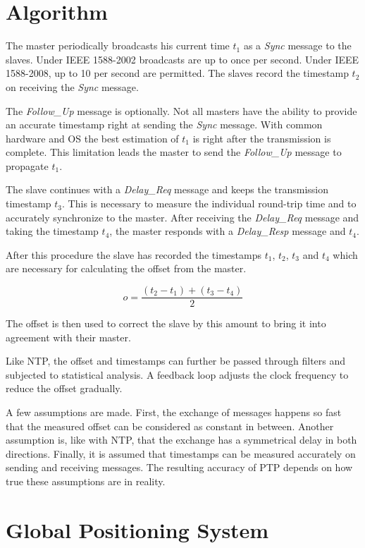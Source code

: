 \section{Algorithm}


The master periodically broadcasts his current time $t_1$ as a \textit{Sync} message to the slaves. Under IEEE 1588-2002 broadcasts are up to once per second. Under IEEE 1588-2008, up to 10 per second are permitted. The slaves record the timestamp $t_2$ on receiving the \textit{Sync} message.

The \textit{Follow\_Up} message is optionally. Not all masters have the ability to provide an accurate timestamp right at sending the \textit{Sync} message. With common hardware and OS the best estimation of $t_1$ is right after the transmission is complete. This limitation leads the master to send the \textit{Follow\_Up} message to propagate $t_1$.

The slave continues with a \textit{Delay\_Req} message and keeps the transmission timestamp $t_3$. This is necessary to measure the individual round-trip time and to accurately synchronize to the master. After receiving the \textit{Delay\_Req} message and taking the timestamp $t_4$, the master responds with a \textit{Delay\_Resp} message and $t_4$.

After this procedure the slave has recorded the timestamps $t_1$, $t_2$, $t_3$ and $t_4$ which are necessary for calculating the offset from the master.

\[ o = \frac{(t_2 - t_1) + (t_3 - t_4)}{2} \]

The offset is then used to correct the slave by this amount to bring it into agreement with their master.

Like NTP, the offset and timestamps can further be passed through filters and subjected to statistical analysis. A feedback loop adjusts the clock frequency to reduce the offset gradually.

A few assumptions are made. First, the exchange of messages happens so fast that the measured offset can be considered as constant in between. Another assumption is, like with NTP, that the exchange has a symmetrical delay in both directions. Finally, it is assumed that timestamps can be measured accurately on sending and receiving messages. The resulting accuracy of PTP depends on how true these assumptions are in reality.

\section{Global Positioning System}

